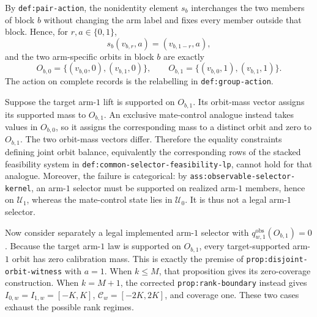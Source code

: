 By \texttt{def:pair-action}, the nonidentity element \(s_b\) interchanges the two members of block \(b\) without changing the arm label and fixes every member outside that block. Hence, for \(r,a\in\{0,1\}\),
\[s_b(v_{b,r},a)=(v_{b,1-r},a),\]
and the two arm-specific orbits in block \(b\) are exactly
\[O_{b,0}=\{(v_{b,0},0),(v_{b,1},0)\},\qquad O_{b,1}=\{(v_{b,0},1),(v_{b,1},1)\}.\]
The action on complete records is the relabelling in \texttt{def:group-action}.

Suppose the target arm-\(1\) lift is supported on \(O_{b,1}\). Its orbit-mass vector assigns its supported mass to \(O_{b,1}\). An exclusive mate-control analogue instead takes values in \(O_{b,0}\), so it assigns the corresponding mass to a distinct orbit and zero to \(O_{b,1}\). The two orbit-mass vectors differ. Therefore the equality constraints defining joint orbit balance, equivalently the corresponding rows of the stacked feasibility system in \texttt{def:common-selector-feasibility-lp}, cannot hold for that analogue. Moreover, the failure is categorical: by \texttt{ass:observable-selector-kernel}, an arm-\(1\) selector must be supported on realized arm-\(1\) members, hence on \(\mathcal U_1\), whereas the mate-control state lies in \(\mathcal U_0\). It is thus not a legal arm-\(1\) selector.

Now consider separately a legal implemented arm-\(1\) selector with \(q^{\mathrm{obs}}_{w,1}(O_{b,1})=0\). Because the target arm-\(1\) law is supported on \(O_{b,1}\), every target-supported arm-\(1\) orbit has zero calibration mass. This is exactly the premise of \texttt{prop:disjoint-orbit-witness} with \(a=1\). When \(k\le M\), that proposition gives its zero-coverage construction. When \(k=M+1\), the corrected \texttt{prop:rank-boundary} instead gives \(I_{0,w}=I_{1,w}=[-K,K]\), \(\mathcal C_w=[-2K,2K]\), and coverage one. These two cases exhaust the possible rank regimes.